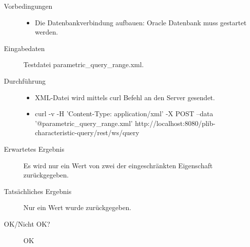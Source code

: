 \begin{description}
\item[Vorbedingungen] 
  \begin{itemize}
   \item Die Datenbankverbindung aufbauen: Oracle Datenbank muss gestartet werden.
  \end{itemize}
\item[Eingabedaten] Testdatei parametric\_query\_range.xml. 
\item[Durchführung]
   \begin{itemize}
   \item XML-Datei wird mittels curl Befehl an den Server gesendet.
   \item curl -v -H 'Content-Type: application/xml' -X POST --data '@parametric\_query\_range.xml' http://localhost:8080/plib-characteristic-query/rest/ws/query
  \end{itemize}
\item[Erwartetes Ergebnis] Es wird nur ein Wert von zwei der eingeschränkten Eigenschaft zurückgegeben.  
\item[Tatsächliches Ergebnis] Nur ein Wert wurde zurückgegeben. 
\item[OK/Nicht OK?] OK
\end{description}

